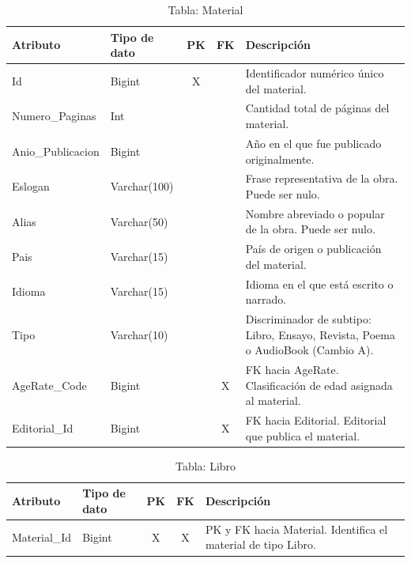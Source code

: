 \documentclass[12pt,a4paper]{article}
\begin{document}
\begin{table}[H]
\centering
\begin{tabularx}{\textwidth}{|l|l|c|c|X|}
\hline
\textbf{Atributo} & \textbf{Tipo de dato} & \textbf{PK} & \textbf{FK} & \textbf{Descripción} \\ \hline
Id                 & Bigint       & X & & Identificador numérico único del material. \\ \hline
Numero\_Paginas    & Int          & & & Cantidad total de páginas del material. \\ \hline
Anio\_Publicacion  & Bigint       & & & Año en el que fue publicado originalmente. \\ \hline
Eslogan            & Varchar(100) & & & Frase representativa de la obra. Puede ser nulo. \\ \hline
Alias              & Varchar(50)  & & & Nombre abreviado o popular de la obra. Puede ser nulo. \\ \hline
Pais               & Varchar(15)  & & & País de origen o publicación del material. \\ \hline
Idioma             & Varchar(15)  & & & Idioma en el que está escrito o narrado. \\ \hline
Tipo               & Varchar(10)  & & & Discriminador de subtipo: Libro, Ensayo, Revista, Poema o AudioBook (Cambio A). \\ \hline
AgeRate\_Code      & Bigint       & & X & FK hacia AgeRate. Clasificación de edad asignada al material. \\ \hline
Editorial\_Id      & Bigint       & & X & FK hacia Editorial. Editorial que publica el material. \\ \hline
\end{tabularx}
\caption{Tabla: Material}
\end{table}

\begin{table}[H]
\centering
\begin{tabularx}{\textwidth}{|l|l|c|c|X|}
\hline
\textbf{Atributo} & \textbf{Tipo de dato} & \textbf{PK} & \textbf{FK} & \textbf{Descripción} \\ \hline
Material\_Id & Bigint & X & X & PK y FK hacia Material. Identifica el material de tipo Libro. \\ \hline
\end{tabularx}
\caption{Tabla: Libro}
\end{table}
\end{document}
